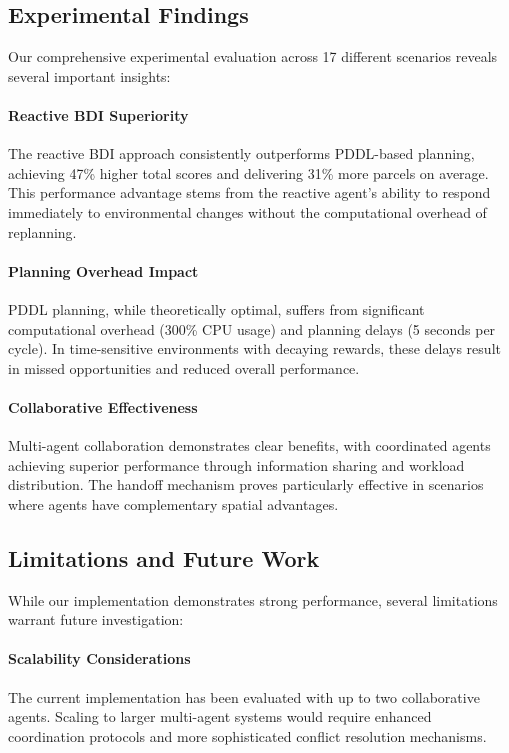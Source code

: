 \subsection{Experimental Findings}

Our comprehensive experimental evaluation across 17 different scenarios reveals several important insights:

\paragraph{Reactive BDI Superiority}
The reactive BDI approach consistently outperforms PDDL-based planning, achieving 47\% higher total scores and delivering 31\% more parcels on average. This performance advantage stems from the reactive agent's ability to respond immediately to environmental changes without the computational overhead of replanning.

\paragraph{Planning Overhead Impact}
PDDL planning, while theoretically optimal, suffers from significant computational overhead (300\% CPU usage) and planning delays (5 seconds per cycle). In time-sensitive environments with decaying rewards, these delays result in missed opportunities and reduced overall performance.

\paragraph{Collaborative Effectiveness}
Multi-agent collaboration demonstrates clear benefits, with coordinated agents achieving superior performance through information sharing and workload distribution. The handoff mechanism proves particularly effective in scenarios where agents have complementary spatial advantages.

\subsection{Limitations and Future Work}

While our implementation demonstrates strong performance, several limitations warrant future investigation:

\paragraph{Scalability Considerations}
The current implementation has been evaluated with up to two collaborative agents. Scaling to larger multi-agent systems would require enhanced coordination protocols and more sophisticated conflict resolution mechanisms.

